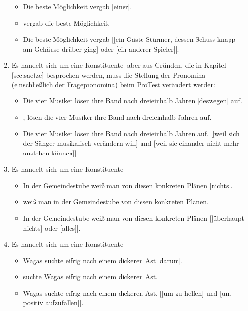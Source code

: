 \begin{enumerate}
\begin{itemize}
      \item \ProTest Die beste Möglichkeit vergab [einer].
      \item {} vergab die beste Möglichkeit.
      \item \KoorTest Die beste Möglichkeit vergab [[ein Gäste-Stürmer, dessen Schuss knapp am Gehäuse drüber ging] oder [ein anderer Spieler]].
    \end{itemize}
  \item Es handelt sich um eine Konstituente, aber aus Gründen, die in Kapitel \ref{sec:saetze} besprochen werden, muss die Stellung der Pronomina (einschließlich der Fragepronomina) beim ProTest verändert werden:
    \begin{itemize}\Lf
      \item \ProTest Die vier Musiker lösen ihre Band nach dreieinhalb Jahren [deswegen] auf.
      \item {}, lösen die vier Musiker ihre Band nach dreieinhalb Jahren auf.
      \item \KoorTest Die vier Musiker lösen ihre Band nach dreieinhalb Jahren auf, [[weil sich der Sänger musikalisch verändern will] und [weil sie einander nicht mehr austehen können]].
    \end{itemize}
  \item Es handelt sich um eine Konstituente:
    \begin{itemize}\Lf
      \item \ProTest In der Gemeindestube weiß man von diesen konkreten Plänen [nichts].
      \item {} weiß man in der Gemeindestube von diesen konkreten Plänen.
      \item \KoorTest In der Gemeindestube weiß man von diesen konkreten Plänen [[überhaupt nichts] oder [alles]].
    \end{itemize}
  \item Es handelt sich um eine Konstituente:
    \begin{itemize}\Lf
      \item \ProTest \Ast Wagas suchte eifrig nach einem dickeren Ast [darum].
      \item \VfTest [Um zu helfen] suchte Wagas eifrig nach einem dickeren Ast.
      \item \KoorTest Wagas suchte eifrig nach einem dickeren Ast, [[um zu helfen] und [um positiv aufzufallen]].
    \end{itemize}

\end{enumerate}

